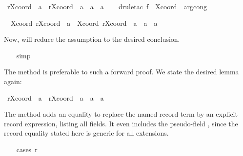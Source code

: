 \begin{isabellebody}
\ {\isachardoublequoteopen}r{\isasymlparr}Xcoord\ {\isacharcolon}{\isacharequal}\ a{\isasymrparr}\ {\isacharequal}\ r{\isasymlparr}Xcoord\ {\isacharcolon}{\isacharequal}\ a{\isacharprime}{\isasymrparr}\ {\isasymLongrightarrow}\ a\ {\isacharequal}\ a{\isacharprime}{\isachardoublequoteclose}\isanewline
%
\isadelimproof
\ \ %
\endisadelimproof
%
\isatagproof
{}\isamarkupfalse%
\ {\isacharparenleft}drule{\isacharunderscore}tac\ f\ {\isacharequal}\ Xcoord\ \ arg{\isacharunderscore}cong{\isacharparenright}%
\begin{isamarkuptxt}%
\begin{isabelle}%
\ {}{\isachardot}\ Xcoord\ {\isacharparenleft}r{\isasymlparr}Xcoord\ {\isacharcolon}{\isacharequal}\ a{\isasymrparr}{\isacharparenright}\ {\isacharequal}\ Xcoord\ {\isacharparenleft}r{\isasymlparr}Xcoord\ {\isacharcolon}{\isacharequal}\ a{\isacharprime}{\isasymrparr}{\isacharparenright}\ {\isasymLongrightarrow}\ a\ {\isacharequal}\ a{\isacharprime}%
\end{isabelle}
    Now,  will reduce the assumption to the desired
    conclusion.%
\end{isamarkuptxt}%
\isamarkuptrue%
\ \ \isamarkupfalse%
\ simp\isanewline
\ \ \isamarkupfalse%
%
\endisatagproof
{\isafoldproof}%
%
\isadelimproof
%
\endisadelimproof
%
\begin{isamarkuptext}%
The  method is preferable to such a forward proof.  We
  state the desired lemma again:%
\end{isamarkuptext}%
\isamarkuptrue%
\isamarkupfalse%
\ {\isachardoublequoteopen}r{\isasymlparr}Xcoord\ {\isacharcolon}{\isacharequal}\ a{\isasymrparr}\ {\isacharequal}\ r{\isasymlparr}Xcoord\ {\isacharcolon}{\isacharequal}\ a{\isacharprime}{\isasymrparr}\ {\isasymLongrightarrow}\ a\ {\isacharequal}\ a{\isacharprime}{\isachardoublequoteclose}%
\isadelimproof
%
\endisadelimproof
%
\isatagproof
%
\begin{isamarkuptxt}%
The  method adds an equality to replace the
  named record term by an explicit record expression, listing all
  fields.  It even includes the pseudo-field , since the
  record equality stated here is generic for all extensions.%
\end{isamarkuptxt}%
\isamarkuptrue%
\ \ \isamarkupfalse%
\ {\isacharparenleft}cases\ r{\isacharparenright}%
\begin{isamarkuptxt}%
\begin{isabelle}%

\end{isabelle}
\end{isamarkuptxt}
\end{isabellebody}
